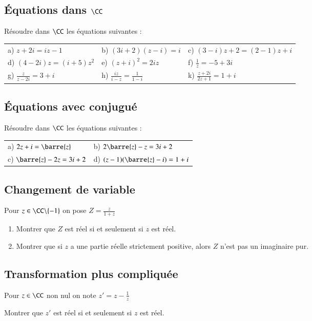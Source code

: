 \documentclass[oneside,12pt]{article}          %
\begin{document}
\subsection{Équations dans $\CC$}
Résoudre dans $\CC$ les équations suivantes :\\
\begin{tabular}{p{} p{} p{}}
    a) $z+2i=iz-1$ & b) $(3i+2)(z-i)=i$ & c) $(3-i)z+2=(2-1)z+i$\\
    d) $(4-2i)z=(i+5)z^2$ & e) $(z+i)^2=2iz$ & f) $\frac{1}{z}=-5+3i$ \\
    g) $\frac{z}{z-2i}=3+i$ & h) $\frac{iz}{i-z}=\frac{1}{1-i}$ & k) $\frac{z+2i}{2z+1}=1+i$
\end{tabular}


\subsection{Équations avec conjugué}
Résoudre dans $\CC$ les équations suivantes : \\
\begin{tabular}{p{} p{}}
    a) $ 2z+i=\barre{z}$ & b) $2\barre{z}-z=3i+2$ \\
    c) $\barre{z}-2z=3i+2$ & d) $(z-1)(\barre{z}-i)=1+i$ 
\end{tabular}



\subsection{Changement de variable}
Pour $z\in\CC\backslash\{-1\}$ on pose $Z=\frac{z}{1+z}$
\begin{enumerate}
	\item Montrer que $Z$ est réel si et seulement si $z$ est réel.
	\item Montrer que si $z$ a une partie réelle strictement positive, alors $Z$ n'est pas un imaginaire pur.
\end{enumerate}



\subsection{Transformation plus compliquée}
Pour $z\in\CC$ non nul on note $z'=z-\frac{1}{z}$

Montrer que $z'$ est réel si et seulement si $z$ est réel.
\end{document}
